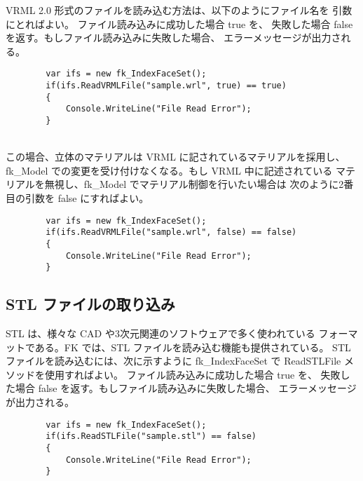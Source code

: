 VRML 2.0 形式のファイルを読み込む方法は、以下のようにファイル名を
引数にとればよい。
ファイル読み込みに成功した場合 true を、
失敗した場合 false を返す。もしファイル読み込みに失敗した場合、
エラーメッセージが出力される。
\\
\begin{screen}
\begin{verbatim}
        var ifs = new fk_IndexFaceSet();
        if(ifs.ReadVRMLFile("sample.wrl", true) == true)
        {
            Console.WriteLine("File Read Error");
        }
\end{verbatim}
\end{screen}
~ \\
この場合、立体のマテリアルは VRML に記されているマテリアルを採用し、
fk\_Model での変更を受け付けなくなる。もし VRML 中に記述されている
マテリアルを無視し、fk\_Model でマテリアル制御を行いたい場合は
次のように2番目の引数を false にすればよい。
\\
\begin{screen}
\begin{verbatim}
        var ifs = new fk_IndexFaceSet();
        if(ifs.ReadVRMLFile("sample.wrl", false) == false)
        {
            Console.WriteLine("File Read Error");
        }
\end{verbatim}
\end{screen}

\subsection{STL ファイルの取り込み}
STL は、様々な CAD や3次元関連のソフトウェアで多く使われている
フォーマットである。FK では、STL ファイルを読み込む機能も提供されている。
STL ファイルを読み込むには、次に示すように fk\_IndexFaceSet で
ReadSTLFile メソッドを使用すればよい。
ファイル読み込みに成功した場合 true を、
失敗した場合 false を返す。もしファイル読み込みに失敗した場合、
エラーメッセージが出力される。
\\
\begin{screen}
\begin{verbatim}
        var ifs = new fk_IndexFaceSet();
        if(ifs.ReadSTLFile("sample.stl") == false)
        {
            Console.WriteLine("File Read Error");
        }
\end{verbatim}
\end{screen}

